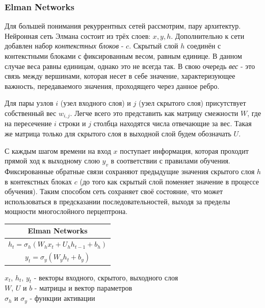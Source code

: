 	\subsubsection{Elman Networks}
	
	Для большей понимания рекуррентных сетей рассмотрим, пару архитектур. Нейронная сеть Элмана состоит из трёх слоев: $x, y, h$. Дополнительно к сети добавлен набор \textit{контекстных блоков} - $c$. Скрытый слой $h$ соединён с контекстными блоками с фиксированным весом, равным единице. В данном случае веса равны единицам, однако это не всегда так. В свою очередь \textit{вес} - это связь между вершинами, которая несет в себе значение, характеризующее важность, передаваемого значения, проходящего через данное ребро. 
	
	Для пары узлов $i$ (узел входного слоя) и $j$ (узел скрытого слоя) присутствует собственный вес $w_{i,j}$. Легче всего это представить как матрицу смежности $W$, где на пересечение $i$ строки и $j$ столбца находятся числа отвечающие за вес. Такая же матрица только для скрытого слоя в выходной слой будем обозначать $U$. 
	
	С каждым шагом времени на вход $x$ поступает информация, которая проходит прямой ход к выходному слою $y_v$ в соответствии с правилами обучения. Фиксированные обратные связи сохраняют предыдущие значения скрытого слоя $h$ в контекстных блоках $c$ (до того как скрытый слой поменяет значение в процессе обучения). Таким способом сеть сохраняет своё состояние, что может использоваться в предсказании последовательностей, выходя за пределы мощности многослойного перцептрона.
	
	\begin{table}[h]
		\centering
		\begin{tabular}{|c|} 
			\hline
			\textbf{Elman Networks}  \\ 
			\hline
			$ h_{t} = \sigma_{h}(W_h x_t + U_h h_{t - 1} + b_h) $ \\ 
			$ y_{t} = \sigma_{y}(W_y h_t + b_y) $ \\
			\hline
		\end{tabular}
	\end{table}
	\begin{tabbing}
		$x_t$, $h_t$, $y_t$  - векторы входного, скрытого, выходного слоя        \\
		$W$, $U$ и $b$ - матрицы и вектор параметров       \\
		$\sigma_h$ и $\sigma_y$ - функции активации
	\end{tabbing}
	
